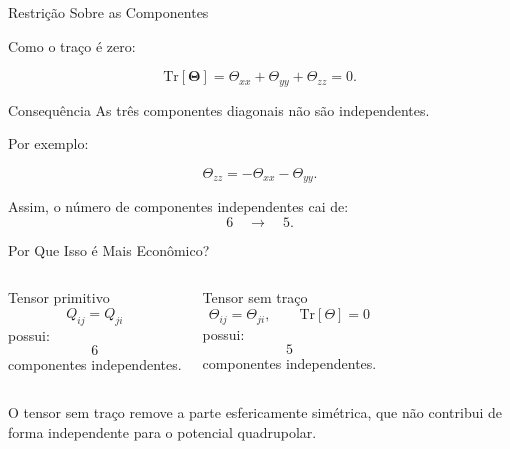 \documentclass[aspectratio=169]{beamer}
\begin{document}
\begin{frame}{Restrição Sobre as Componentes}

Como o traço é zero:

\begin{eqbox}
\begin{equation}
\mathrm{Tr}[\boldsymbol{\Theta}]
=
\Theta_{xx}
+
\Theta_{yy}
+
\Theta_{zz}
=
0.
\tag{4.66}
\end{equation}
\end{eqbox}

\begin{alertblock}{Consequência}
As três componentes diagonais não são independentes.
\end{alertblock}

Por exemplo:

\[
\Theta_{zz}
=
-\Theta_{xx}-\Theta_{yy}.
\]

\begin{center}
\Large
Assim, o número de componentes independentes cai de:
\[
6
\quad\longrightarrow\quad
5.
\]
\end{center}

\end{frame}

\begin{frame}{Por Que Isso é Mais Econômico?}

\begin{columns}[T]


\begin{mybox}{Tensor primitivo}
\[
Q_{ij}=Q_{ji}
\]
possui:
\[
6
\]
componentes independentes.
\end{mybox}


\begin{alertblock}{Tensor sem traço}
\[
\Theta_{ij}=\Theta_{ji},
\qquad
\mathrm{Tr}[\Theta]=0
\]
possui:
\[
5
\]
componentes independentes.
\end{alertblock}

\end{columns}

\vspace{0.5cm}

\begin{center}
\Large
O tensor sem traço remove a parte esfericamente simétrica, que não contribui de forma independente para o potencial quadrupolar.
\end{center}

\end{frame}
\end{document}

